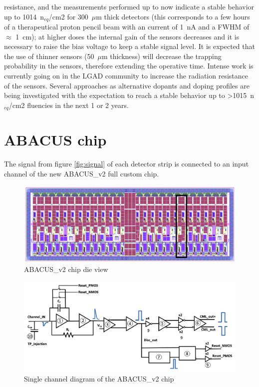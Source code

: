 resistance, and the measurements performed up to now indicate a stable behavior up to 1014~n$_{eq}$/cm2 for 300~$\mu$m thick detectors (this corresponds to a few hours of a therapeutical proton
pencil beam with an current of 1~nA and a FWHM of $\approx$ 1~cm); at higher doses the internal gain
of the sensors decreases and it is necessary to raise the bias voltage to keep a stable signal level.
It is expected that the use of thinner sensors (50~$\mu$m thickness) will decrease the trapping
probability in the sensors, therefore extending the operative time. Intense work is currently going
on in the LGAD community to increase the radiation resistance of the sensors. Several
approaches as alternative dopants and doping profiles are being investigated with the expectation
to reach a stable behavior up to >1015~n$_{eq}$/cm2 fluencies in the next 1 or 2 years.


\section{ABACUS chip}\label{chip}
\noindent The signal from figure \ref{fig:signal} of each detector strip is connected to an input channel of the new ABACUS\_v2 full custom chip\cite{abacus}\cite{dac}.
\begin{figure}[H]
	\centering
	\includegraphics[width=0.9\linewidth]{IMG/ch2/ABACUS2.png}
	\caption{ABACUS\_v2 chip die view}
	\label{fig:abacus2}
\end{figure}

\begin{figure}[H]
	\centering
	\includegraphics[width=0.8\linewidth]{IMG/ch2/Abacus_channel.png}
	\caption{Single channel diagram of the ABACUS\_v2 chip}
	\label{fig:abacuschannel}
\end{figure}

